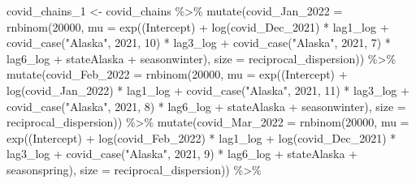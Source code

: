 \documentclass[
]{book}
\newenvironment{Shaded}{\begin{snugshade}}{\end{snugshade}}
\newcommand{\AttributeTok}[1]{\textcolor[rgb]{0.77,0.63,0.00}{#1}}
\newcommand{\DecValTok}[1]{\textcolor[rgb]{0.00,0.00,0.81}{#1}}
\newcommand{\FunctionTok}[1]{\textcolor[rgb]{0.00,0.00,0.00}{#1}}
\newcommand{\NormalTok}[1]{#1}
\newcommand{\OtherTok}[1]{\textcolor[rgb]{0.56,0.35,0.01}{#1}}
\newcommand{\SpecialCharTok}[1]{\textcolor[rgb]{0.00,0.00,0.00}{#1}}
\newcommand{\StringTok}[1]{\textcolor[rgb]{0.31,0.60,0.02}{#1}}
\begin{document}
\begin{Shaded}
\begin{Highlighting}[]
\NormalTok{covid\_chains\_1 }\OtherTok{\textless{}{-}}\NormalTok{ covid\_chains }\SpecialCharTok{\%\textgreater{}\%}
  \FunctionTok{mutate}\NormalTok{(}\AttributeTok{covid\_Jan\_2022 =} \FunctionTok{rnbinom}\NormalTok{(}\DecValTok{20000}\NormalTok{, }\AttributeTok{mu =} \FunctionTok{exp}\NormalTok{(}\StringTok{\textasciigrave{}}\AttributeTok{(Intercept)}\StringTok{\textasciigrave{}} \SpecialCharTok{+} \FunctionTok{log}\NormalTok{(covid\_Dec\_2021) }\SpecialCharTok{*}\NormalTok{ lag1\_log }\SpecialCharTok{+} \FunctionTok{covid\_case}\NormalTok{(}\StringTok{"Alaska"}\NormalTok{, }\DecValTok{2021}\NormalTok{, }\DecValTok{10}\NormalTok{) }\SpecialCharTok{*}\NormalTok{ lag3\_log }\SpecialCharTok{+} \FunctionTok{covid\_case}\NormalTok{(}\StringTok{"Alaska"}\NormalTok{, }\DecValTok{2021}\NormalTok{, }\DecValTok{7}\NormalTok{) }\SpecialCharTok{*}\NormalTok{ lag6\_log }\SpecialCharTok{+}\NormalTok{ stateAlaska }\SpecialCharTok{+}\NormalTok{ seasonwinter), }\AttributeTok{size =}\NormalTok{ reciprocal\_dispersion)) }\SpecialCharTok{\%\textgreater{}\%}
  \FunctionTok{mutate}\NormalTok{(}\AttributeTok{covid\_Feb\_2022 =} \FunctionTok{rnbinom}\NormalTok{(}\DecValTok{20000}\NormalTok{, }\AttributeTok{mu =} \FunctionTok{exp}\NormalTok{(}\StringTok{\textasciigrave{}}\AttributeTok{(Intercept)}\StringTok{\textasciigrave{}} \SpecialCharTok{+} \FunctionTok{log}\NormalTok{(covid\_Jan\_2022) }\SpecialCharTok{*}\NormalTok{ lag1\_log }\SpecialCharTok{+} \FunctionTok{covid\_case}\NormalTok{(}\StringTok{"Alaska"}\NormalTok{, }\DecValTok{2021}\NormalTok{, }\DecValTok{11}\NormalTok{) }\SpecialCharTok{*}\NormalTok{ lag3\_log }\SpecialCharTok{+} \FunctionTok{covid\_case}\NormalTok{(}\StringTok{"Alaska"}\NormalTok{, }\DecValTok{2021}\NormalTok{, }\DecValTok{8}\NormalTok{) }\SpecialCharTok{*}\NormalTok{ lag6\_log }\SpecialCharTok{+}\NormalTok{ stateAlaska }\SpecialCharTok{+}\NormalTok{ seasonwinter), }\AttributeTok{size =}\NormalTok{ reciprocal\_dispersion)) }\SpecialCharTok{\%\textgreater{}\%}
  \FunctionTok{mutate}\NormalTok{(}\AttributeTok{covid\_Mar\_2022 =} \FunctionTok{rnbinom}\NormalTok{(}\DecValTok{20000}\NormalTok{, }\AttributeTok{mu =} \FunctionTok{exp}\NormalTok{(}\StringTok{\textasciigrave{}}\AttributeTok{(Intercept)}\StringTok{\textasciigrave{}} \SpecialCharTok{+} \FunctionTok{log}\NormalTok{(covid\_Feb\_2022) }\SpecialCharTok{*}\NormalTok{ lag1\_log }\SpecialCharTok{+} \FunctionTok{log}\NormalTok{(covid\_Dec\_2021) }\SpecialCharTok{*}\NormalTok{ lag3\_log }\SpecialCharTok{+} \FunctionTok{covid\_case}\NormalTok{(}\StringTok{"Alaska"}\NormalTok{, }\DecValTok{2021}\NormalTok{, }\DecValTok{9}\NormalTok{) }\SpecialCharTok{*}\NormalTok{ lag6\_log }\SpecialCharTok{+}\NormalTok{ stateAlaska }\SpecialCharTok{+}\NormalTok{ seasonspring), }\AttributeTok{size =}\NormalTok{ reciprocal\_dispersion)) }\SpecialCharTok{\%\textgreater{}\%}

\end{Highlighting}
\end{Shaded}
\end{document}
